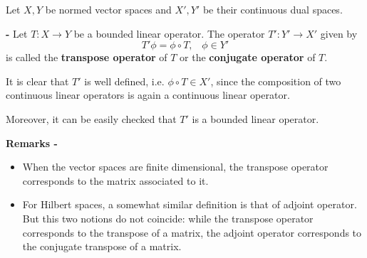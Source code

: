 \documentclass[12pt]{article}
\begin{document}
Let $X, Y$ be normed vector spaces and $X', Y'$ be their continuous dual spaces.

{\bf {} -} Let $T:X \longrightarrow Y$ be a bounded linear operator. The operator $T':Y' \longrightarrow X'$ given by
\begin{displaymath}
T'\phi = \phi \circ T , \;\;\; \phi \in Y'
\end{displaymath}
is called the {\bf transpose operator} of $T$ or the {\bf conjugate operator} of $T$.

It is clear that $T'$ is well defined, i.e. $\phi \circ T \in X'$, since the composition of two continuous linear operators is again a continuous linear operator.

Moreover, it can be easily checked that $T'$ is a bounded linear operator.

{\bf Remarks -}
\begin{itemize}
\item When the vector spaces are finite dimensional, the transpose operator corresponds to  the matrix associated to it.
\item For Hilbert spaces, a somewhat similar definition is that of adjoint operator. But this two notions do not coincide: while the transpose operator corresponds to the transpose of a matrix, the adjoint operator corresponds to the conjugate transpose of a matrix.
\end{itemize}
\end{document}
